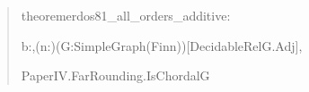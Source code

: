 \documentclass[spanish,11pt,a4paper]{article}
\newlength{\LeanCharWidth}
\begin{document}
\begin{quote}\fontsize{8.5}{10.2}\selectfont\ttfamily\raggedright\setlength{\parskip}{0pt}\settowidth{\LeanCharWidth}{0}
\noindent theorem\hspace*{\dimexpr 1\LeanCharWidth\relax}erdos81\_all\_orders\_additive\hspace*{\dimexpr 1\LeanCharWidth\relax}:\par
\noindent \hspace*{\dimexpr 4\LeanCharWidth\relax}{\LeanSymbols ∃}\hspace*{\dimexpr 1\LeanCharWidth\relax}b\hspace*{\dimexpr 1\LeanCharWidth\relax}:\hspace*{\dimexpr 1\LeanCharWidth\relax}{\LeanSymbols ℕ},\hspace*{\dimexpr 1\LeanCharWidth\relax}{\LeanSymbols ∀}\hspace*{\dimexpr 1\LeanCharWidth\relax}(n\hspace*{\dimexpr 1\LeanCharWidth\relax}:\hspace*{\dimexpr 1\LeanCharWidth\relax}{\LeanSymbols ℕ})\hspace*{\dimexpr 1\LeanCharWidth\relax}(G\hspace*{\dimexpr 1\LeanCharWidth\relax}:\hspace*{\dimexpr 1\LeanCharWidth\relax}SimpleGraph\hspace*{\dimexpr 1\LeanCharWidth\relax}(Fin\hspace*{\dimexpr 1\LeanCharWidth\relax}n))\hspace*{\dimexpr 1\LeanCharWidth\relax}[DecidableRel\hspace*{\dimexpr 1\LeanCharWidth\relax}G.Adj],\par
\noindent \hspace*{\dimexpr 6\LeanCharWidth\relax}PaperIV.FarRounding.IsChordal\hspace*{\dimexpr 1\LeanCharWidth\relax}G\hspace*{\dimexpr 1\LeanCharWidth\relax}{\LeanSymbols →}\par

\end{quote}
\end{document}
